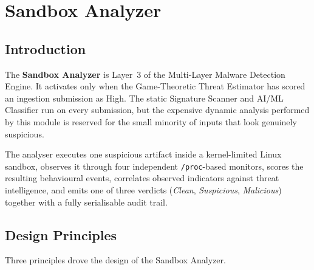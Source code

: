\documentclass[12pt, a4paper]{report}
\begin{document}
\cleardoublepage


\chapter{Sandbox Analyzer}
\label{chap:sandbox}

\section{Introduction}

The \textbf{Sandbox Analyzer} is Layer~3 of the Multi-Layer Malware
Detection Engine. It activates only when the Game-Theoretic Threat
Estimator has scored an ingestion submission as High. The static
Signature Scanner and AI/ML Classifier run on every submission, but
the expensive dynamic analysis performed by this module is reserved
for the small minority of inputs that look genuinely suspicious.

The analyser executes one suspicious artifact inside a kernel-limited
Linux sandbox, observes it through four independent \texttt{/proc}-based
monitors, scores the resulting behavioural events, correlates observed
indicators against threat intelligence, and emits one of three verdicts
(\emph{Clean}, \emph{Suspicious}, \emph{Malicious}) together with a
fully serialisable audit trail.

\section{Design Principles}

Three principles drove the design of the Sandbox Analyzer.
\end{document}
